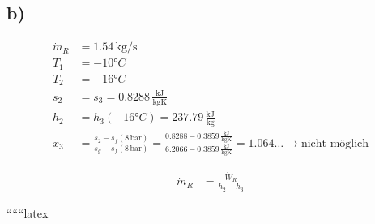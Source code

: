 

\subsection*{b)}

\begin{align*}
    \dot{m}_R &= 1.54 \, \text{kg/s} \\
    T_1 &= -10°C \\
    T_2 &= -16°C \\
    s_2 &= s_3 = 0.8288 \, \frac{\text{kJ}}{\text{kgK}} \\
    h_2 &= h_3 \left( -16°C \right) = 237.79 \, \frac{\text{kJ}}{\text{kg}} \\
    x_3 &= \frac{s_2 - s_f (8 \, \text{bar})}{s_g - s_f (8 \, \text{bar})} = \frac{0.8288 - 0.3859 \, \frac{\text{kJ}}{\text{kgK}}}{6.2066 - 0.3859 \, \frac{\text{kJ}}{\text{kgK}}} = 1.064 \ldots \rightarrow \text{nicht möglich}
\end{align*}

\begin{align*}
    \dot{m}_R &= \frac{\dot{W}_R}{h_2 - h_3}
\end{align*}

``````latex